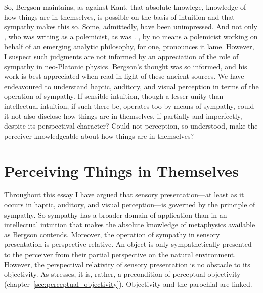 So, Bergson maintains, as against Kant, that absolute knowlege, knowledge of how things are in themselves, is possible on the basis of intuition and that sympathy makes this so. Some, admittedly, have been unimpressed. And not only \citet{Russell:1912rt}, who was writing as a polemicist, as was \citet{Stebbing:1914kx}. \citet[202]{Jay:1994aa}, by no means a polemicist working on behalf of an emerging analytic philosophy, for one, pronounces it lame. However, I suspect such judgments are not informed by an appreciation of the role of sympathy in neo-Platonic physics. Bergson's thought was so informed, and his work is best appreciated when read in light of these ancient sources. We have endeavoured to understand haptic, auditory, and visual perception in terms of the operation of sympathy. If sensible intuition, though a lesser unity than intellectual intuition, if such there be, operates too by means of sympathy, could it not also disclose how things are in themselves, if partially and imperfectly, despite its perspectival character? Could not perception, so understood, make the perceiver knowledgeable about how things are in themselves?


\section{Perceiving Things in Themselves} %
\label{sec:perceiving_things_in_themselves}

Throughout this essay I have argued that sensory presentation---at least as it occurs in haptic, auditory, and visual perception---is governed by the principle of sympathy. So sympathy has a broader domain of application than in an intellectual intuition that makes the absolute knowledge of metaphysics available as Bergson contends. Moreover, the operation of sympathy in sensory presentation is perspective-relative. An object is only sympathetically presented to the perceiver from their partial perspective on the natural environment. However, the perspectival relativity of sensory presentation is no obstacle to its objectivity. As \citet{Merleau-Ponty:1967fj} stresses, it is, rather, a precondition of perceptual objectivity (chapter~\ref{sec:perceptual_objectivity}). Objectivity and the parochial are linked. 

